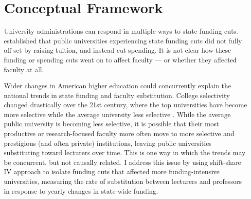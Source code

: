 \section{Conceptual Framework}
\label{sec:conceptual}
University administrations can respond in multiple ways to state funding cuts.
\cite{NBERw23736} established that public universities experiencing state funding cuts did not fully off-set by raising tuition, and instead cut spending.
It is not clear how these funding or spending cuts went on to affect faculty --- or whether they affected faculty at all.

Wider changes in American higher education could concurrently explain the national trends in state funding and faculty substitution.
College selectivity changed drastically over the 21st century, where the top universities have become more selective while the average university less selective \citep{hoxby2009changing}.
While the average public university is becoming less selective, it is possible that their most productive or research-focused faculty more often move to more selective and prestigious (and often private) institutions, leaving public universities substituting toward lecturers over time.
This is one way in which the trends may be concurrent, but not causally related.
I address this issue by using shift-share IV approach to isolate funding cuts that affected more funding-intensive universities, measuring the rate of substitution between lecturers and professors in response to yearly changes in state-wide funding.

